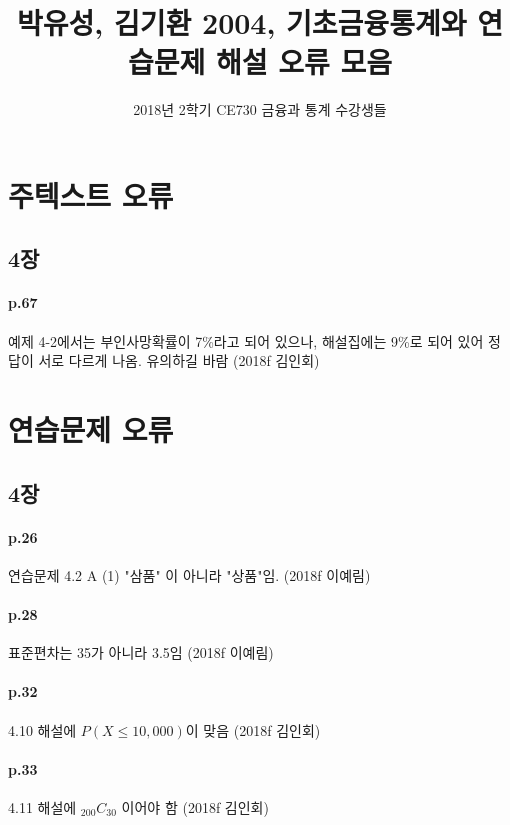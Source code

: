\documentclass[a4paper]{article}
\title{박유성, 김기환 2004, 기초금융통계와 연습문제 해설 오류 모음}
\author{2018년 2학기 CE730 금융과 통계 수강생들}
\begin{document}
\maketitle
\section{주텍스트 오류} %
\label{sec:주텍스트 오류}
\subsection{4장} %
\label{sub:주4장}
\paragraph{p.67} %
\label{par:p_67}
예제 4-2에서는 부인사망확률이 7\%라고 되어 있으나, 해설집에는 9\%로 되어 있어 정답이 서로 다르게 나옴. 유의하길 바람 (2018f 김인회)

\section{연습문제 오류} %
\label{sec:연습문제 오류}
\subsection{4장} %
\label{sub:보조4장}
\paragraph{p.26} %
\label{par:p_26}
연습문제 4.2 A (1) "삼품" 이 아니라 "상품"임. (2018f 이예림)
\paragraph{p.28} %
\label{par:p_28}
표준편차는 35가 아니라 3.5임 (2018f 이예림)
\paragraph{p.32} %
\label{par:p_32}
4.10 해설에 $P(X\le 10,000)$이 맞음 (2018f 김인회)
\paragraph{p.33} %
\label{par:p_33}
4.11 해설에 $_{200}C_{30}$ 이어야 함 (2018f 김인회)
\end{document}
